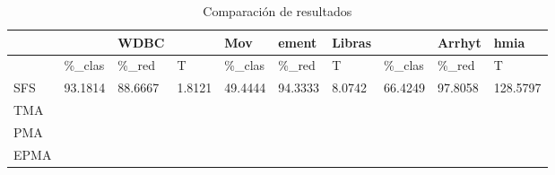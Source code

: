 \begin{table}[H]
	\centering
	\small
	\begin{tabular}{l|lll|lll|lll}
				& 			& WDBC 		&			&	  Mov	& ement 	& Libras	&			& Arrhyt	& hmia		\\ \hline
				& \%\_clas	& \%\_red	& T			& \%\_clas	& \%\_red	& T			& \%\_clas	& \%\_red	& T			\\ \hline
		SFS		& 93.1814	& 88.6667	& 1.8121	& 49.4444	& 94.3333	& 8.0742	& 66.4249	& 97.8058	& 128.5797	\\ \hline
		TMA		& 			& 			& 			& 			& 			& 			& 			& 			& 			\\ \hline
		PMA		& 			& 			& 			& 			& 			& 			& 			& 			& 			\\ \hline
		EPMA	& 			& 			& 			& 			& 			& 			& 			& 			& 
		
	\end{tabular}
	\caption{Comparación de resultados}
	\label{Compare}
\end{table}